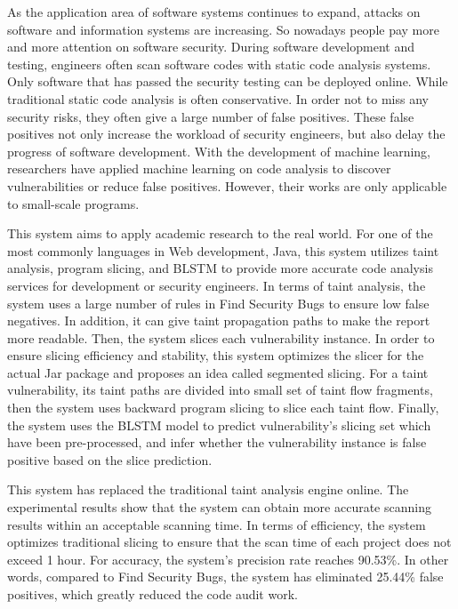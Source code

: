 \documentclass[oneside, master, review]{NJUthesis}
\theoremstyle{plain}
\begin{document}
\begin{englishabstract}
    
As the application area of software systems continues to expand, attacks on software and information systems are increasing. So nowadays people pay more and more attention on software security. During software development and testing, engineers often scan software codes with static code analysis systems. Only software that has passed the security testing can be deployed online. While traditional static code analysis is often conservative. In order not to miss any security risks, they often give a large number of false positives. These false positives not only increase the workload of security engineers, but also delay the progress of software development. With the development of  machine learning, researchers have applied machine learning on code analysis to discover vulnerabilities or reduce false positives. However, their works are only applicable to small-scale programs. 

This system aims to apply academic research to the real world. For one of the most commonly languages in Web development, Java, this system utilizes taint analysis, program slicing, and BLSTM to provide more accurate code analysis services for development or security engineers. In terms of taint analysis, the system uses a large number of rules in Find Security Bugs to ensure low false negatives. In addition, it can give taint propagation paths to make the report more readable. Then, the system slices each vulnerability instance. In order to ensure slicing efficiency and stability, this system optimizes the slicer for the actual Jar package and proposes an idea called ​​segmented slicing. For a taint vulnerability, its taint paths are divided into small set of taint flow fragments, then the system uses backward program slicing to slice each taint flow. Finally, the system uses the BLSTM model to predict vulnerability's slicing set which have been pre-processed, and infer whether the vulnerability instance is false positive based on the slice prediction.

This system has replaced the traditional taint analysis engine online. The experimental results show that the system can obtain more accurate scanning results within an acceptable scanning time. In terms of efficiency, the system optimizes traditional slicing to ensure that the scan time of each project does not exceed 1 hour. For accuracy,  the system's precision rate reaches 90.53\%. In other words, compared to Find Security Bugs, the system has eliminated 25.44\% false positives, which greatly reduced the code audit work.

\end{englishabstract}
\end{document}
